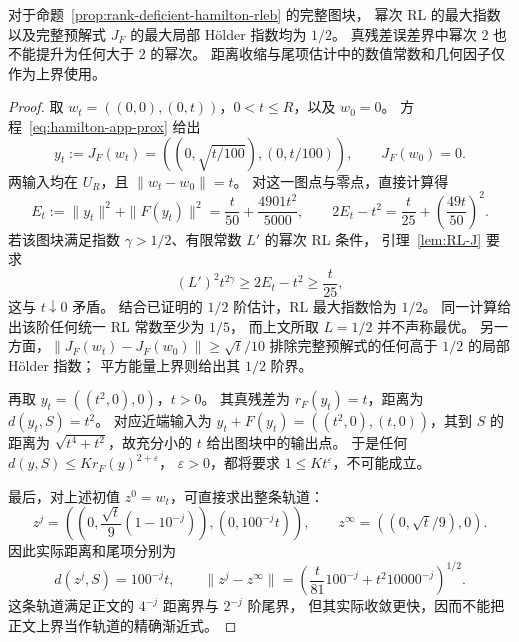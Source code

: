 \begin{proposition}[指数的最优性与上界的保守性]
\label{prop:hamilton-sharp-exponents}
对于命题~\ref{prop:rank-deficient-hamilton-rleb} 的完整图块，
幂次 RL 的最大指数以及完整预解式 $J_F$ 的最大局部 H\"older 指数均为 $1/2$。
真残差误差界中幂次 $2$ 也不能提升为任何大于 $2$ 的幂次。
距离收缩与尾项估计中的数值常数和几何因子仅作为上界使用。
\end{proposition}

\begin{proof}
取 $w_t=((0,0),(0,t))$，$0<t\le R$，以及 $w_0=0$。
方程~\eqref{eq:hamilton-app-prox} 给出
\[
 y_t:=J_F(w_t)=((0,\sqrt{t/100}),(0,t/100)),\qquad J_F(w_0)=0.
\]
两输入均在 $U_R$，且 $\|w_t-w_0\|=t$。
对这一图点与零点，直接计算得
\[
 E_t:=\|y_t\|^2+\|F(y_t)\|^2
 =\frac{t}{50}+\frac{4901t^2}{5000},\qquad
 2E_t-t^2=\frac{t}{25}+\left(\frac{49t}{50}\right)^2.
\]
若该图块满足指数 $\gamma>1/2$、有限常数 $L'$ 的幂次 RL 条件，
引理~\ref{lem:RL-J} 要求
\[
 (L')^2t^{2\gamma}\ge2E_t-t^2\ge\frac{t}{25},
\]
这与 $t\downarrow0$ 矛盾。
结合已证明的 $1/2$ 阶估计，RL 最大指数恰为 $1/2$。
同一计算给出该阶任何统一 RL 常数至少为 $1/5$，
而上文所取 $L=1/2$ 并不声称最优。
另一方面，$\|J_F(w_t)-J_F(w_0)\|\ge\sqrt t/10$
排除完整预解式的任何高于 $1/2$ 的局部 H\"older 指数；
平方能量上界则给出其 $1/2$ 阶界。

再取 $y_t=((t^2,0),0)$，$t>0$。
其真残差为 $r_F(y_t)=t$，距离为 $d(y_t,S)=t^2$。
对应近端输入为 $y_t+F(y_t)=((t^2,0),(t,0))$，其到 $S$
的距离为 $\sqrt{t^4+t^2}$，故充分小的 $t$ 给出图块中的输出点。
于是任何 $d(y,S)\leq K r_F(y)^{2+\varepsilon}$，
$\varepsilon>0$，都将要求 $1\leq Kt^\varepsilon$，不可能成立。

最后，对上述初值 $z^0=w_t$，可直接求出整条轨道：
\[
 z^j=\left(
      \left(0,\frac{\sqrt t}{9}(1-10^{-j})\right),
      (0,100^{-j}t)\right),\qquad
 z^\infty=((0,\sqrt t/9),0).
\]
因此实际距离和尾项分别为
\[
 d(z^j,S)=100^{-j}t,\qquad
 \|z^j-z^\infty\|
 =\left(\frac{t}{81}100^{-j}+t^2 10000^{-j}\right)^{1/2}.
\]
这条轨道满足正文的 $4^{-j}$ 距离界与 $2^{-j}$ 阶尾界，
但其实际收敛更快，因而不能把正文上界当作轨道的精确渐近式。
\end{proof}

